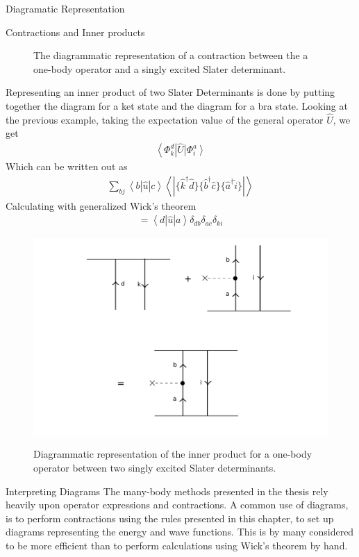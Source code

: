 \documentclass[twoside,english]{uiofysmaster}
\begin{document}
\begin{chapter}{Diagramatic Representation}
\begin{section}{Contractions and Inner products}
\begin{figure}[H]
			\caption{The diagrammatic representation of a contraction between the a one-body operator and a singly excited Slater determinant.}
			\label{Contraction}
		\end{figure}
		Representing an inner product of two Slater Determinants is done by putting together the diagram for a ket state and the diagram for a bra state. Looking at the previous example, taking the expectation value of the general operator $\hat U$, we get 
		\begin{align}
			\left< \Phi_k^d \right| \hat U \left| \Phi_i^a \right>
		\end{align}
		Which can be written out as
		\begin{align}
			\sum_{bj} \left< b | \hat u | c \right> \left< \right. | \{ \hat k^\dagger \hat d \} \{ \hat b^\dagger \hat c \} \{ \hat a^\dagger \hat i \} | \left. \right>
		\end{align}
		Calculating with generalized Wick's theorem
		\begin{align}
			= \left< d | \hat u | a \right> \delta_{db} \delta_{ac} \delta_{ki}
		\end{align}
		\begin{figure}[H]
			\includegraphics[width=\textwidth]{Figures/InnerProduct.pdf}
			\label{InnerProduct}
			\caption{Diagrammatic representation of the inner product for a one-body operator between two singly excited Slater determinants.}
		\end{figure}
	\end{section}
	\newpage
	\begin{section}{Interpreting Diagrams}	
		The many-body methods presented in the thesis rely heavily upon operator expressions and contractions. A common use of diagrams, is to perform  contractions using the rules presented in this chapter, to set up diagrams representing the energy and wave functions. This is by many considered to be more efficient than to perform calculations using Wick's theorem by hand. 


\end{section}
\end{chapter}
\end{document}
